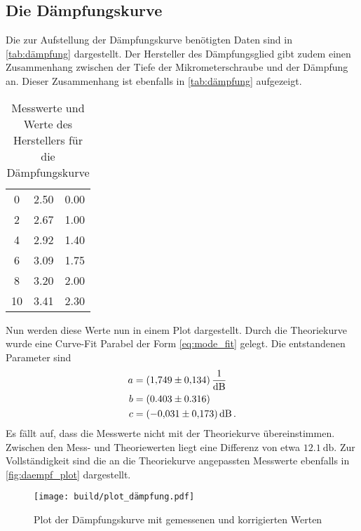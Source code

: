 \subsection{Die Dämpfungskurve}
\label{ssec:a3}

Die zur Aufstellung der Dämpfungskurve benötigten Daten sind in \autoref{tab:dämpfung} dargestellt. 
Der Hersteller des Dämpfungsglied gibt zudem einen Zusammenhang zwischen der Tiefe der Mikrometerschraube und der Dämpfung an.
Dieser Zusammenhang ist ebenfalls in \autoref{tab:dämpfung} aufgezeigt.

\begin{table}
    \centering
    \caption{Messwerte und Werte des Herstellers für die Dämpfungskurve}
    \label{tab:dämpfung}
    \begin{tabular}{S[table-format=2.0] S[table-format=1.2] S[table-format=1.2]}
        \toprule
         &  &  \\
         & 2.50 & 0.00\\
        2 & 2.67 & 1.00\\
        4 & 2.92 & 1.40\\
        6 & 3.09 & 1.75\\
        8 & 3.20 & 2.00\\
        10 & 3.41 & 2.30\\
        \bottomrule
    \end{tabular}
\end{table}

Nun werden diese Werte nun in einem Plot dargestellt.
Durch die Theoriekurve wurde eine Curve-Fit Parabel der Form \autoref{eq:mode_fit} gelegt.
Die entstandenen Parameter sind 
\begin{align*}
    a &= \SI{1.749+-0.134}{\per\decibel} \\
    b &= (0.403 \pm 0.316) \\
    c &= \SI{-0.031+-0.173}{\decibel} \, .
\end{align*}
Es fällt auf, dass die Messwerte nicht mit der Theoriekurve übereinstimmen.
Zwischen den Mess- und  Theoriewerten liegt eine Differenz von etwa $\SI{12.1}{\decibel}$.
Zur Vollständigkeit sind die an die Theoriekurve angepassten Messwerte ebenfalls in \autoref{fig:daempf_plot} dargestellt.

\begin{figure}
    \centering
    \texttt{[image: build/plot\_dämpfung.pdf]}
    \caption{Plot der Dämpfungskurve mit gemessenen und korrigierten Werten}
    \label{fig:daempf_plot}
\end{figure}

